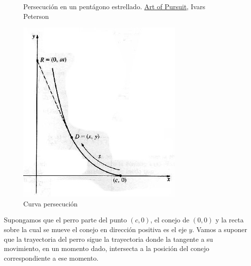 \documentclass{article}
\begin{document}
\begin{figure}[h]
\begin{center}
 \caption{\small Persecución en un pentágono estrellado.
\href{https://www.sciencenews.org/article/art-pursuit-3}{Art of Pursuit},
Ivars Peterson
}
\end{center}
\end{figure}

\begin{figure}
\begin{center}
\vspace{-1cm}
 \includegraphics[scale=.3]{imagenes/persecucion.jpg}
\end{center}
\caption{Curva persecución}\label{fig:curva_per}
\end{figure}
Supongamos que el perro parte del punto $(c,0)$, el conejo de $(0,0 )$ y la recta sobre la cual se mueve el conejo en dirección positiva  es el eje $y$. 
Vamos a suponer que la trayectoria del perro sigue la trayectoria donde
la tangente a su movimiento, en un momento dado, intersecta a la posición del conejo correspondiente a ese momento.
\end{document}
